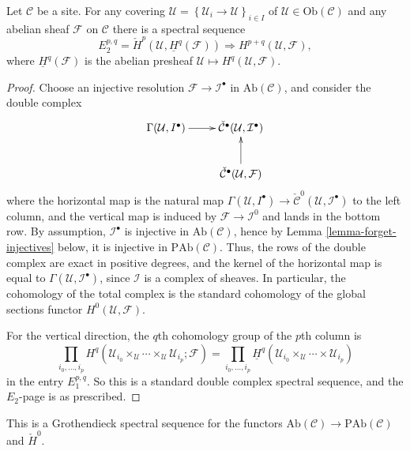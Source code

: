 \begin{theorem}
\label{theorem-cech-ss}
Let $\mathcal{C}$ be a site. For any covering $\mathcal{U}= 
\left\{\mathcal{U}_i\to \mathcal{U}\right\}_{i\in I}$ of  $\mathcal{U}\in 
\text{Ob}(\mathcal{C})$ and any abelian sheaf $\mathcal{F}$ on $\mathcal{C}$ 
there is a spectral sequence 
$$
E_2^{p, q}
=
\check H^p(\mathcal{U},\underline{H}^q(\mathcal{F}))
\Rightarrow 
H^{p+q}(\mathcal{U}, \mathcal{F}),
$$
where $\underline{H}^q(\mathcal{F})$ is the abelian presheaf  
$\mathcal{U}\mapsto H^q(\mathcal{U}, \mathcal{F})$.  
\end{theorem}
  
\begin{proof}
Choose an injective resolution $\mathcal{F}\to \mathcal{I}^\bullet$ in 
$\text{Ab}(\mathcal{C})$, and consider the double complex
$$
\xymatrix{
{\Gamma(\mathcal{U},  I^\bullet)}  \ar[r] & 
{\check{\mathcal{C}}^\bullet(\mathcal{U}, \mathcal{I}^\bullet)} \\ 
& {\check{\mathcal{C}}^\bullet(\mathcal{U}, \mathcal{F})} \ar[u]
}
$$
where the horizontal map is the natural map $\Gamma(\mathcal{U},  I^\bullet) 
\to \check{\mathcal{C}}^0(\mathcal{U}, \mathcal{I}^\bullet)$ to the left 
column, and the vertical map is induced by  $\mathcal{F}\to \mathcal{I}^0$ and 
lands in the bottom row. By assumption, $\mathcal{I}^\bullet$ is injective in 
$\text{Ab}(\mathcal{C})$, hence by
Lemma \ref{lemma-forget-injectives}
below, it is injective in 
$\text{PAb}(\mathcal{C})$. Thus, the rows of the double complex are exact in 
positive degrees, and the kernel of the horizontal map is equal to 
$\Gamma(\mathcal{U}, \mathcal{I}^\bullet)$, since $\mathcal{I}$ is a complex of 
sheaves. In particular, the cohomology of the total complex is the standard 
cohomology of the global sections functor $H^0(\mathcal{U}, \mathcal{F})$. 

\medskip\noindent
For the vertical direction, the $q$th cohomology group of the $p$th column is
$$ 
\prod_{i_0,\ldots, i_p}  H^q(\mathcal{U}_{i_0}\times_\mathcal{U} \cdots 
\times_\mathcal{U} \mathcal{U}_{i_p} ; \mathcal{F}) =\prod_{i_0, \dots, 
i_p}\underline{H}^q(\mathcal{U}_{i_0}\times_\mathcal{U} \cdots \times 
\mathcal{U}_{i_p})
$$
in the entry $E_1^{p,q}$. So this is a standard double complex spectral
sequence, and the $E_2$-page is as prescribed.
\end{proof}
  
\begin{remark}
\label{remark-grothendieck-ss}
This is a Grothendieck spectral sequence for the functors 
$\text{Ab}(\mathcal{C}) \to \text{PAb}(\mathcal{C})$ and $\check H^0$.
\end{remark}
  





